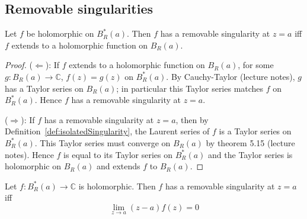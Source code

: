 \subsection{Removable singularities}

\begin{lemma}\label{lem:removableSingularityIffExtendsToHolomorphic}
	Let $f$ be holomorphic on $B_R^*(a)$. Then $f$ has a removable singularity at $z = a$ iff $f$ extends to a holomorphic function on $B_R(a)$.
\end{lemma}

\begin{proof}
	($\Leftarrow$): If $f$ extends to a holomorphic function on $B_R(a)$, for some $g: B_R(a) \rightarrow \mathbb{C}$, $f(z) = g(z)$ on $B_R^*(a)$. By Cauchy-Taylor (lecture notes), $g$ has a Taylor series on $B_R(a)$; in particular this Taylor series matches $f$ on $B_R^*(a)$. Hence $f$ has a removable singularity at $z = a$.
	
	($\Rightarrow$): If $f$ has a removable singularity at $z = a$, then by Definition~\ref{def:isolatedSingularity}, the Laurent series of $f$ is a Taylor series on $B_R^*(a)$. This Taylor series must converge on $B_R(a)$ by theorem 5.15 (lecture notes). Hence $f$ is equal to its Taylor series on $B_R^*(a)$ and the Taylor series is holomorphic on $B_R(a)$ and extends $f$ to $B_R(a)$.
\end{proof}

\begin{proposition}\label{prop:removableSingularityIffLimitIsZero}
	Let $f: B_R^*(a) \rightarrow \mathbb{C}$ is holomorphic. Then $f$ has a removable singularity at $z = a$ iff
	\[
		\lim_{z \to a} (z - a) f(z) = 0
	\]
\end{proposition}

